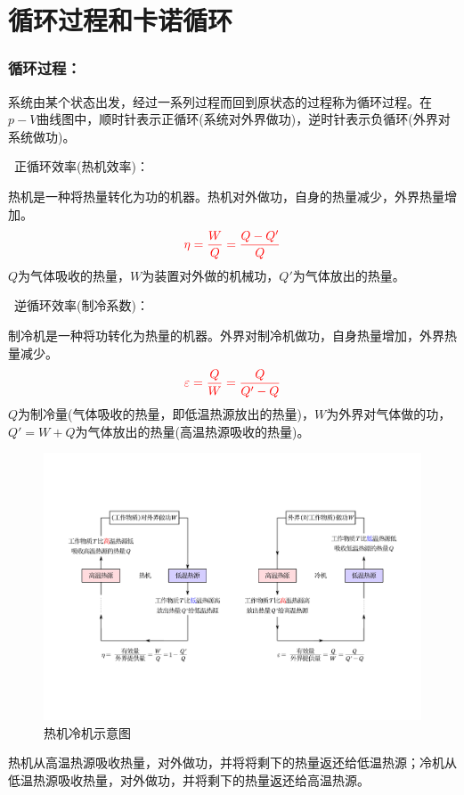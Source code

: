\documentclass[zihao=-4,UTF8]{report}
\begin{document}
\section{循环过程和卡诺循环}
\subsubsection{循环过程：}
系统由某个状态出发，经过一系列过程而回到原状态的过程称为循环过程。在$p-V$曲线图中，顺时针表示正循环(系统对外界做功)，逆时针表示负循环(外界对系统做功)。\par
{}\ 正循环效率(热机效率)：\par
热机是一种将热量转化为功的机器。热机对外做功，自身的热量减少，外界热量增加。
\begin{equation}
    {\color{red}\eta = \frac{W}{Q} = \frac{Q - Q'}{Q}}
\end{equation}
{\color{gray}\small $Q$为气体吸收的热量，$W$为装置对外做的机械功，$Q'$为气体放出的热量。}\par
{}\ 逆循环效率(制冷系数)：\par
制冷机是一种将功转化为热量的机器。外界对制冷机做功，自身热量增加，外界热量减少。
\begin{equation}
    {\color{red}\varepsilon =\frac{Q}{W} = \frac{Q}{Q' - Q}}
\end{equation}
{\color{gray}\small $Q$为制冷量(气体吸收的热量，即低温热源放出的热量)，$W$为外界对气体做的功，$Q'= W+Q$为气体放出的热量(高温热源吸收的热量)。}
\begin{figure}[H]
    \centering
    \includegraphics[width = \textwidth]{pic/热机冷机示意图.pdf}
    \caption{热机冷机示意图}
\end{figure}
热机从高温热源吸收热量，对外做功，并将将剩下的热量返还给低温热源；冷机从低温热源吸收热量，对外做功，并将剩下的热量返还给高温热源。
\end{document}
